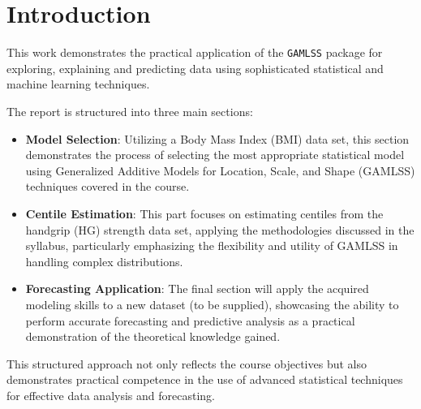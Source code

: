 \section{Introduction}

This work demonstrates the practical application of the \verb|GAMLSS| package for exploring, explaining
and predicting data using sophisticated statistical and machine learning techniques.

The report is structured into three main sections:
\begin{itemize}
\item \textbf{Model Selection}: Utilizing a Body Mass Index (BMI) data set, this section
  demonstrates the process of selecting the most appropriate statistical model using Generalized
  Additive Models for Location, Scale, and Shape (GAMLSS) techniques covered in the course.
\item \textbf{Centile Estimation}: This part focuses on estimating centiles from the handgrip (HG) strength data set,
  applying the methodologies discussed in the syllabus, particularly emphasizing the flexibility and
  utility of GAMLSS in handling complex distributions.
\item \textbf{Forecasting Application}: The final section will apply the acquired modeling skills to
  a new dataset (to be supplied), showcasing the ability to perform accurate forecasting and predictive
  analysis as a practical demonstration of the theoretical knowledge gained.
\end{itemize}

This structured approach not only reflects the course objectives but also demonstrates practical
competence in the use of advanced statistical techniques for effective data analysis and forecasting.
